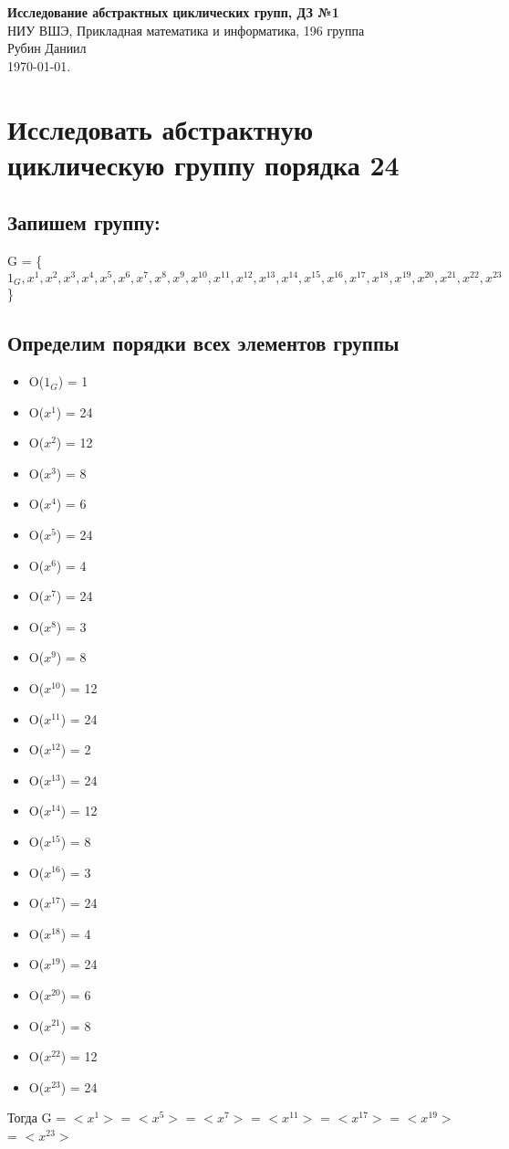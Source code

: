 \documentclass[a4paper, 12pt]{article}
\begin{document}
\begin{center}
    \LARGE
       \textbf{Исследование абстрактных циклических групп, ДЗ №1} \\ {\Large НИУ ВШЭ, Прикладная математика и информатика, 196 группа} \\ Рубин Даниил \\ \today.
\end{center}
\newpage

\section*{Исследовать абстрактную циклическую группу порядка 24}
    \subsection*{Запишем группу:}
        G = \{$1_G,x^{1}, x^{2}, x^{3}, x^{4}, x^{5}, x^{6}, x^{7}, x^{8}, x^{9}, x^{10}, x^{11}, x^{12}, x^{13}, x^{14}, x^{15}, x^{16}, x^{17}, x^{18}, x^{19}, x^{20}, x^{21}, x^{22}, x^{23}$\}
    \subsection*{Определим порядки всех элементов группы}
        \begin{itemize}
            \item O($1_G$) = 1
            \item O($x^1$) = 24
            \item O($x^{2}$) = 12
            \item O($x^{3}$) = 8
            \item O($x^{4}$) = 6
            \item O($x^{5}$) = 24
            \item O($x^{6}$) = 4
            \item O($x^{7}$) = 24
            \item O($x^{8}$) = 3
            \item O($x^{9}$) = 8
            \item O($x^{10}$) = 12
            \item O($x^{11}$) = 24
            \item O($x^{12}$) = 2
            \item O($x^{13}$) = 24
            \item O($x^{14}$) = 12
            \item O($x^{15}$) = 8
            \item O($x^{16}$) = 3
            \item O($x^{17}$) = 24
            \item O($x^{18}$) = 4
            \item O($x^{19}$) = 24
            \item O($x^{20}$) = 6
            \item O($x^{21}$) = 8
            \item O($x^{22}$) = 12
            \item O($x^{23}$) = 24
        \end{itemize}
            Тогда G = $<x^1>$ = $<x^5>$ = $<x^7>$ = $<x^{11}>$ = $<x^{17}>$ = $<x^{19}>$ = $<x^{23}>$
\end{document}
